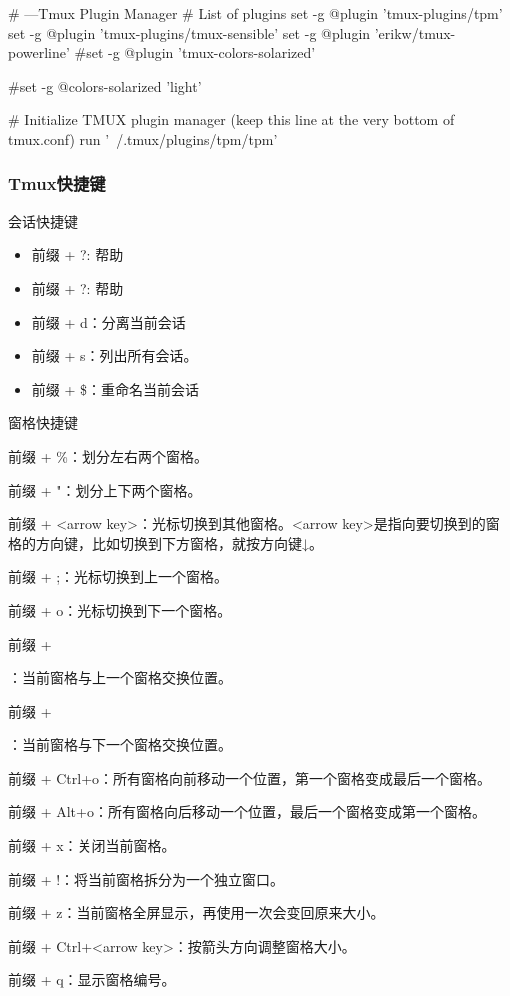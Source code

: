\begin{messagebox}
# ---Tmux Plugin Manager
# List of plugins
set -g @plugin 'tmux-plugins/tpm'
set -g @plugin 'tmux-plugins/tmux-sensible'
set -g @plugin 'erikw/tmux-powerline'
#set -g @plugin 'tmux-colors-solarized'

#set -g @colors-solarized 'light'

# Initialize TMUX plugin manager (keep this line at the very bottom of tmux.conf)
run '~/.tmux/plugins/tpm/tpm'
\end{messagebox}

\subsubsection{Tmux快捷键}
会话快捷键
\begin{itemize}
\item 前缀 + ?: 帮助
\item 前缀 + ?: 帮助
\item 前缀 + d：分离当前会话
\item 前缀 + s：列出所有会话。
\item 前缀 + \$：重命名当前会话
\end{itemize}

窗格快捷键
\begin{itemize}
\item 前缀 +  \%：划分左右两个窗格。
\item 前缀 +  "：划分上下两个窗格。
\item 前缀 +  <arrow key>：光标切换到其他窗格。<arrow key>是指向要切换到的窗格的方向键，比如切换到下方窗格，就按方向键↓。
\item 前缀 +  ;：光标切换到上一个窗格。
\item 前缀 +  o：光标切换到下一个窗格。
\item 前缀 +  {：当前窗格与上一个窗格交换位置。
\item 前缀 +  }：当前窗格与下一个窗格交换位置。
\item 前缀 +  Ctrl+o：所有窗格向前移动一个位置，第一个窗格变成最后一个窗格。
\item 前缀 +  Alt+o：所有窗格向后移动一个位置，最后一个窗格变成第一个窗格。
\item 前缀 +  x：关闭当前窗格。
\item 前缀 +  !：将当前窗格拆分为一个独立窗口。
\item 前缀 +  z：当前窗格全屏显示，再使用一次会变回原来大小。
\item 前缀 +  Ctrl+<arrow key>：按箭头方向调整窗格大小。
\item 前缀 +  q：显示窗格编号。
\end{itemize}

